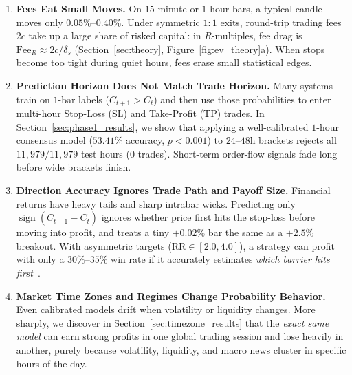 \documentclass{article}
\newcommand{\FeeR}{\mathrm{Fee}_R}
\newcommand{\RR}{\mathrm{RR}}
\newcommand{\TP}{\mathrm{TP}}
\newcommand{\SL}{\mathrm{SL}}
\begin{document}
\begin{enumerate}
    \item \textbf{Fees Eat Small Moves.} On $15$-minute or $1$-hour bars, a typical candle moves only $0.05\%$--$0.40\%$. Under symmetric $1{:}1$ exits, round-trip trading fees $2c$ take up a large share of risked capital: in $R$-multiples, fee drag is $\FeeR \approx 2c / \delta_s$ (Section~\ref{sec:theory}, Figure~\ref{fig:ev_theory}a). When stops become too tight during quiet hours, fees erase small statistical edges.
    \item \textbf{Prediction Horizon Does Not Match Trade Horizon.} Many systems train on $1$-bar labels ($C_{t+1} > C_t$) and then use those probabilities to enter multi-hour Stop-Loss ($\SL$) and Take-Profit ($\TP$) trades. In Section~\ref{sec:phase1_results}, we show that applying a well-calibrated $1$-hour consensus model ($53.41\%$ accuracy, $p<0.001$) to $24$--$48$h brackets rejects all $11{,}979 / 11{,}979$ test hours ($0$ trades). Short-term order-flow signals fade long before wide brackets finish.
    \item \textbf{Direction Accuracy Ignores Trade Path and Payoff Size.} Financial returns have heavy tails and sharp intrabar wicks. Predicting only $\operatorname{sign}(C_{t+1} - C_t)$ ignores whether price first hits the stop-loss before moving into profit, and treats a tiny $+0.02\%$ bar the same as a $+2.5\%$ breakout. With asymmetric targets ($\RR \in [2.0, 4.0]$), a strategy can profit with only a $30\%$--$35\%$ win rate if it accurately estimates \emph{which barrier hits first}~\citep{LopezDePrado2018}.
    \item \textbf{Market Time Zones and Regimes Change Probability Behavior.} Even calibrated models drift when volatility or liquidity changes. More sharply, we discover in Section~\ref{sec:timezone_results} that the \emph{exact same model} can earn strong profits in one global trading session and lose heavily in another, purely because volatility, liquidity, and macro news cluster in specific hours of the day.
\end{enumerate}
\end{document}
